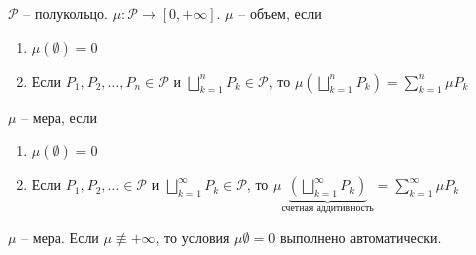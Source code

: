 \begin{definition}
    $\mathcal{P}$ -- полукольцо. $\mu: \mathcal{P} \rightarrow [0, +\infty]$. $\mu$ -- объем, если 

    \begin{enumerate}
        \item $\mu(\emptyset) = 0$
        \item Если $P_1, P_2, \dots, P_n \in \mathcal{P}$ и $\bigsqcup_{k=1}^n P_k \in \mathcal{P}$, то $\mu \left(\bigsqcup_{k=1}^n P_k\right) = \sum_{k=1}^{n} \mu P_k$ 
    \end{enumerate}
\end{definition}

\begin{definition}
    $\mu$ -- мера, если 

    \begin{enumerate}
        \item $\mu(\emptyset) = 0$
        \item Если $P_1, P_2, \dots \in \mathcal{P}$ и $\bigsqcup_{k=1}^{\infty} P_k \in \mathcal{P}$, то $\mu \underbrace{\left(\bigsqcup_{k=1}^{\infty} P_k\right)}_{\text{счетная аддитивность}} = \sum_{k=1}^{\infty} \mu P_k$ 
    \end{enumerate}
\end{definition}

\begin{exerc}
    $\mu$ -- мера. Если $\mu \not \equiv +\infty$, то условия $\mu \emptyset = 0$ выполнено автоматически.
\end{exerc}

